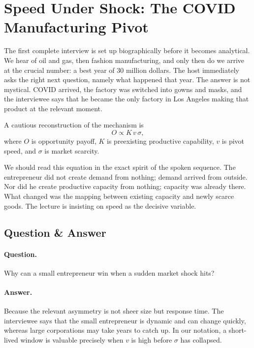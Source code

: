 \section{Speed Under Shock: The COVID Manufacturing Pivot}

The first complete interview is set up biographically before it becomes analytical. We hear of oil and gas, then fashion manufacturing, and only then do we arrive at the crucial number: a best year of \(30\) million dollars. The host immediately asks the right next question, namely what happened that year. The answer is not mystical. COVID arrived, the factory was switched into gowns and masks, and the interviewee says that he became the only factory in Los Angeles making that product at the relevant moment.

A cautious reconstruction of the mechanism is
\begin{equation}
O \propto K\,v\,\sigma,
\end{equation}
where \(O\) is opportunity payoff, \(K\) is preexisting productive capability, \(v\) is pivot speed, and \(\sigma\) is market scarcity.

We should read this equation in the exact spirit of the spoken sequence. The entrepreneur did not create demand from nothing; demand arrived from outside. Nor did he create productive capacity from nothing; capacity was already there. What changed was the mapping between existing capacity and newly scarce goods. The lecture is insisting on speed as the decisive variable.

\subsection{Question \& Answer}

\paragraph{Question.} Why can a small entrepreneur win when a sudden market shock hits?

\paragraph{Answer.} Because the relevant asymmetry is not sheer size but response time. The interviewee says that the small entrepreneur is dynamic and can change quickly, whereas large corporations may take years to catch up. In our notation, a short-lived window is valuable precisely when \(v\) is high before \(\sigma\) has collapsed.

